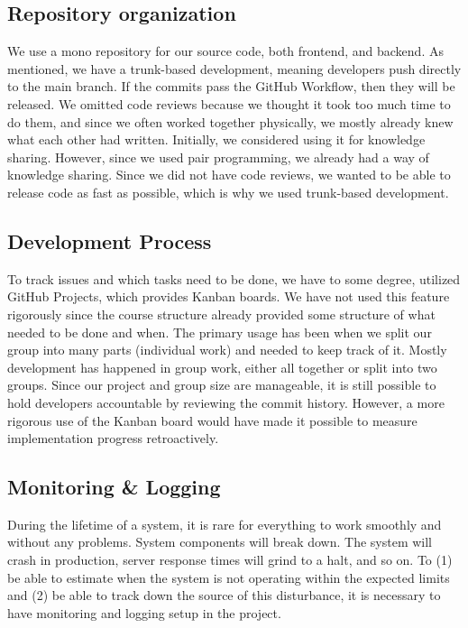 \subsection{Repository organization}
We use a mono repository for our source code, both frontend, and backend. As mentioned, we have a trunk-based development, meaning developers push directly to the main branch. If the commits pass the GitHub Workflow, then they will be released. We omitted code reviews because we thought it took too much time to do them, and since we often worked together physically, we mostly already knew what each other had written. Initially, we considered using it for knowledge sharing. However, since we used pair programming, we already had a way of knowledge sharing. Since we did not have code reviews, we wanted to be able to release code as fast as possible, which is why we used trunk-based development.

\subsection{Development Process}
To track issues and which tasks need to be done, we have to some degree, utilized GitHub Projects, which provides Kanban boards. We have not used this feature rigorously since the course structure already provided some structure of what needed to be done and when. The primary usage has been when we split our group into many parts (individual work) and needed to keep track of it. Mostly development has happened in group work, either all together or split into two groups. Since our project and group size are manageable, it is still possible to hold developers accountable by reviewing the commit history. However, a more rigorous use of the Kanban board would have made it possible to measure implementation progress retroactively. 

\subsection{Monitoring \& Logging}
During the lifetime of a system, it is rare for everything to work smoothly and without any problems. System components will break down. The system will crash in production, server response times will grind to a halt, and so on. To (1) be able to estimate when the system is not operating within the expected limits and (2) be able to track down the source of this disturbance, it is necessary to have monitoring and logging setup in the project. \\

